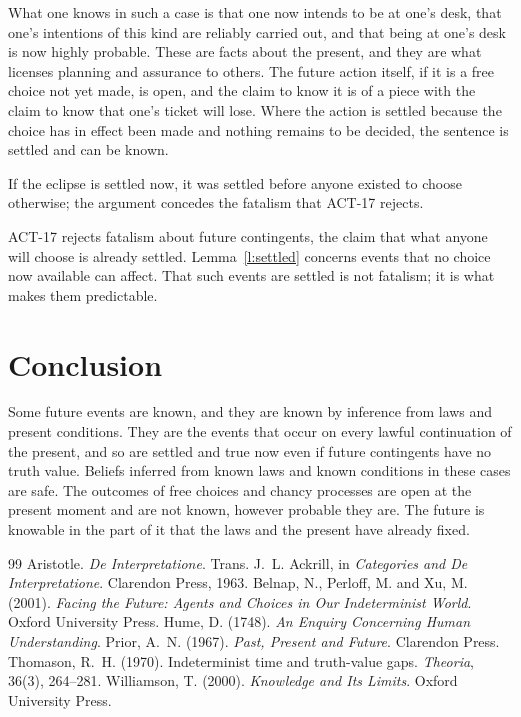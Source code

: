 \documentclass{situationist-preprint}
\begin{document}
\begin{reply}
What one knows in such a case is that one now intends to be at one's desk, that one's intentions of this kind are reliably carried out, and that being at one's desk is now highly probable. These are facts about the present, and they are what licenses planning and assurance to others. The future action itself, if it is a free choice not yet made, is open, and the claim to know it is of a piece with the claim to know that one's ticket will lose. Where the action is settled because the choice has in effect been made and nothing remains to be decided, the sentence is settled and can be known.
\end{reply}

\begin{objection}[Fatalism]\label{o:fat}
If the eclipse is settled now, it was settled before anyone existed to choose otherwise; the argument concedes the fatalism that ACT-17 rejects.
\end{objection}

\begin{reply}
ACT-17 rejects fatalism about future contingents, the claim that what anyone will choose is already settled. Lemma~\ref{l:settled} concerns events that no choice now available can affect. That such events are settled is not fatalism; it is what makes them predictable.
\end{reply}

\section{Conclusion}

Some future events are known, and they are known by inference from laws and present conditions. They are the events that occur on every lawful continuation of the present, and so are settled and true now even if future contingents have no truth value. Beliefs inferred from known laws and known conditions in these cases are safe. The outcomes of free choices and chancy processes are open at the present moment and are not known, however probable they are. The future is knowable in the part of it that the laws and the present have already fixed.

\begin{thebibliography}{99}\small
{} Aristotle. \emph{De Interpretatione}. Trans. J.~L. Ackrill, in \emph{Categories and De Interpretatione}. Clarendon Press, 1963.
 Belnap, N., Perloff, M. and Xu, M. (2001). \emph{Facing the Future: Agents and Choices in Our Indeterminist World}. Oxford University Press.
 Hume, D. (1748). \emph{An Enquiry Concerning Human Understanding}.
 Prior, A.~N. (1967). \emph{Past, Present and Future}. Clarendon Press.
 Thomason, R.~H. (1970). Indeterminist time and truth-value gaps. \emph{Theoria}, 36(3), 264--281.
 Williamson, T. (2000). \emph{Knowledge and Its Limits}. Oxford University Press.
\end{thebibliography}
\end{document}
